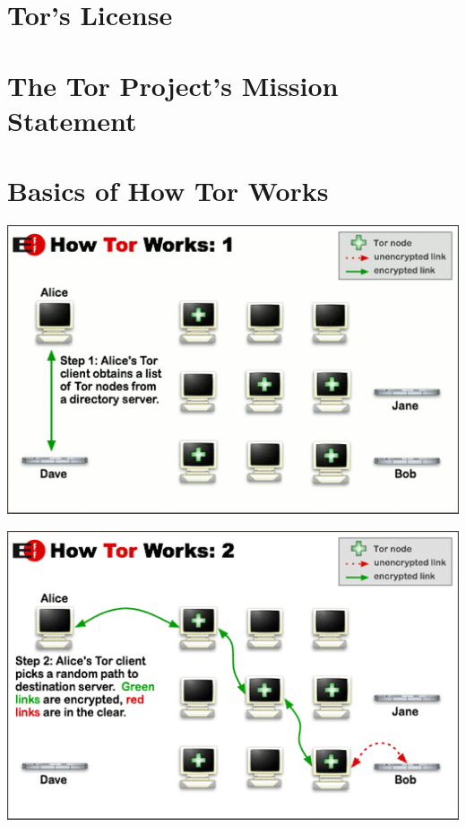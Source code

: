 \documentclass[11pt]{article}
\begin{document}
\appendix

\section{Tor's License}
\label{Tor:License}


\section{The Tor Project's Mission Statement}
\label{Tor:MissionStatement}



\section{Basics of How Tor Works}
\label{Tor:HowTorWorks}

\begin{center}
\includegraphics[natwidth=510bp,natheight=326bp,width= 0.7\linewidth]{appendix/htw1.png}
\end{center}


\begin{center}
\includegraphics[natwidth=510bp,natheight=326bp,width= 0.7\linewidth]{appendix/htw2.png}
\end{center}

\end{document}
